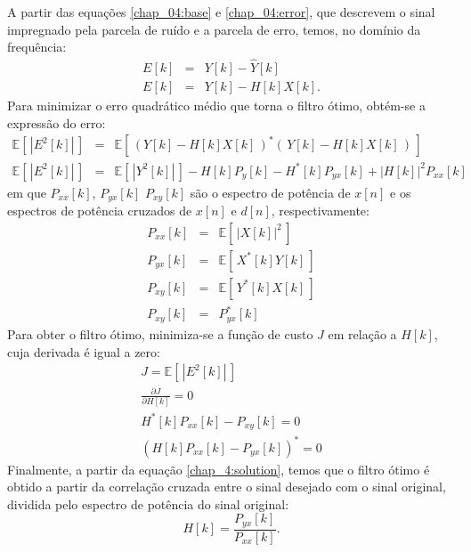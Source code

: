 A partir das equações \ref{chap_04:base} e \ref{chap_04:error}, que descrevem o
sinal impregnado pela parcela de ruído e a parcela de erro, temos, no domínio da
frequência:
\begin{eqnarray}
    E[k] &=& Y[k] - \hat{Y}[k] \\
    E[k] &=& Y[k] - H[k]X[k] \label{chap_4:eq_error}.
\end{eqnarray}
Para minimizar o erro quadrático médio que torna o filtro ótimo, obtém-se a expressão do erro:
\begin{eqnarray}
    \mathbb{E}\left[\,|E^2[k]|\,\right] &=& \mathbb{E}\left[\,\left(Y[k]-H[k]X[k]\,\right)^\ast \left(\,Y[k]-H[k]X[k]\,\right)\,\right] \\
    \mathbb{E}\left[\,|E^2[k]|\,\right] &=& \mathbb{E}\left[\,|Y^2[k]|\,\right] - H[k]P_{y}[k] - H^\ast[k]P_{yx}[k] + |H[k]|^2P_{xx}[k]
\end{eqnarray}
em que $P_{xx}[k]$, $P_{yx}[k]$ $P_{xy}[k]$ são o espectro de potência de $x[n]$ e os espectros
de potência cruzados de $x[n]$ e $d[n]$, respectivamente:
\begin{eqnarray}
    P_{xx}[k] &=& \mathbb{E}\left[\,|X[k]|^2  \,\right] \\ \label{chap_04:P_xx}
    P_{yx}[k] &=& \mathbb{E}\left[\,X^*[k]Y[k]\,\right] \\ \label{chap_04:P_yx}
    P_{xy}[k] &=& \mathbb{E}\left[\,Y^*[k]X[k]\,\right] \\
    P_{xy}^{}[k] &=& {P}_{yx}^*[k]
\end{eqnarray}
Para obter o filtro ótimo, minimiza-se a função de custo $J$ em
relação a $H[k]$, cuja derivada é igual a zero:
\begin{eqnarray}
    J = \mathbb{E}\left[\,|E^2[k]|\,\right] \\
    \frac{\partial J}{\partial H[k]} = 0 \\
    H^*[k]P_{xx}[k] - P_{xy}[k] = 0 \\
    \left(H[k]P_{xx}[k] - P_{yx}[k]\right)^* = 0 \label{chap_4:solution}
\end{eqnarray}
Finalmente, a partir da equação \ref{chap_4:solution}, temos que o filtro ótimo é obtido a partir da correlação cruzada
entre o sinal desejado com o sinal original, dividida pelo espectro de potência do sinal original:
\begin{equation}
    H[k] = \frac{P_{yx}[k]}{P_{xx}[k]}.
\end{equation}

